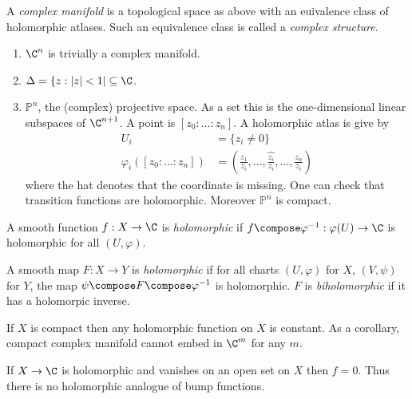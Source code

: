 \documentclass[a4paper]{article}
\renewcommand{\P}{\mathbb P} %
\begin{document}
\begin{definition}
  A \emph{complex manifold} is a topological space as above with an euivalence class of holomorphic atlases. Such an equivalence class is called a \emph{complex structure}.
\end{definition}

\begin{eg}\leavevmode
  \begin{enumerate}
  \item \(\C^n\) is trivially a complex manifold.
  \item \(\Delta = \{z: |z| < 1| \subseteq \C\).
  \item \(\P^n\), the (complex) projective space. As a set this is the one-dimensional linear subspaces of \(\C^{n + 1}\). A point is \([z_0: \dots: z_n]\). A holomorphic atlas is give by
    \begin{align*}
      U_i &= \{z_i \neq 0\} \\
      \varphi_i([z_0: \dots:z_n]) &= (\frac{z_1}{z_i}, \dots, \hat{\frac{z_i}{z_i}}, \dots, \frac{z_n}{z_i})
    \end{align*}
    where the hat denotes that the coordinate is missing. One can check that transition functions are holomorphic. Moreover \(\P^n\) is compact.
  \end{enumerate}
\end{eg}

\begin{definition}
  A smooth function \(f: X \to \C\) is \emph{holomorphic} if \(f \compose \varphi^{-1}: \varphi(U) \to \C\) is holomorphic for all \((U, \varphi)\).

  A smooth map \(F: X \to Y\) is \emph{holomorphic} if for all charts \((U, \varphi)\) for \(X\), \((V, \psi)\) for \(Y\), the map \(\psi \compose F \compose \varphi^{-1}\) is holomorphic. \(F\) is \emph{biholomorphic} if it has a holomorpic inverse.
\end{definition}

\begin{ex}
  If \(X\) is compact then any holomorphic function on \(X\) is constant. As a corollary, compact complex manifold cannot embed in \(\C^m\) for any \(m\).
\end{ex}

\begin{ex}
  If \(X \to \C\) is holomorphic and vanishes on an open set on \(X\) then \(f = 0\). Thus there is no holomorphic analogue of bump functions.
\end{ex}
\end{document}
